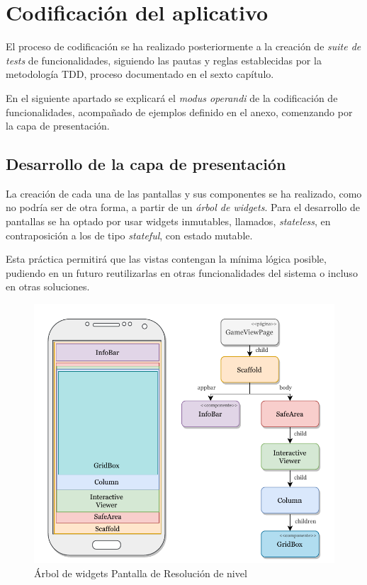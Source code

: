 \section{Codificación del aplicativo}
El proceso de codificación se ha realizado posteriormente a la creación de \textit{suite de tests} de funcionalidades, siguiendo las pautas y
reglas establecidas por la metodología TDD, proceso documentado en el sexto capítulo.

En el siguiente apartado se explicará el \textit{modus operandi} de la codificación de funcionalidades, acompañado de ejemplos definido 
en el anexo, comenzando por la capa de presentación.

\subsection{Desarrollo de la capa de presentación}
La creación de cada una de las pantallas y sus componentes se ha realizado, como no podría ser de otra forma, a partir de un \textit{árbol de widgets}. 
Para el desarrollo de pantallas se ha optado por usar widgets inmutables, llamados, \textit{stateless}, en contraposición a los de tipo \textit{stateful},
con estado mutable. \cite{10.1007/978-981-15-1465-4_56} 

Esta práctica permitirá que las vistas contengan la mínima lógica posible, pudiendo en un futuro reutilizarlas
en otras funcionalidades del sistema o incluso en otras soluciones.

\begin{figure}[H]
  \centering
  \includegraphics[scale=0.83]{images/treewidgets.pdf}
  \caption{Árbol de widgets Pantalla de Resolución de nivel}
  \label{fig:tree-widgets-1}
\end{figure}

